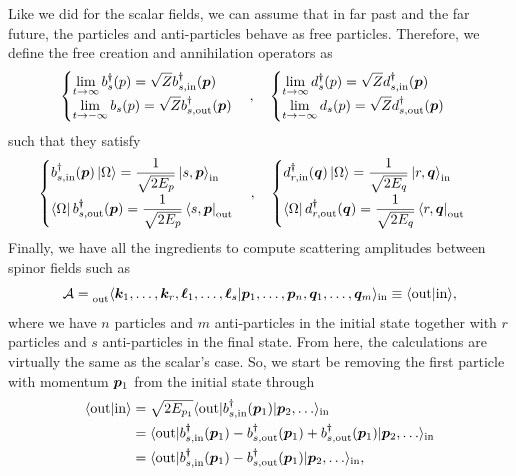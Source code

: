 Like we did for the scalar fields, we can assume that in far past and the far future, the particles and anti-particles behave as free particles. Therefore, we define the free creation and annihilation operators as 
\begin{equation}
    \begin{cases}
        \displaystyle\lim_{t \to \infty}b_s^\dagger(p) = \sqrt{Z}b_{s,\mathrm{in}}^\dagger(\bm{p}) \\
        \displaystyle\lim_{t \to -\infty}b_s(p) = \sqrt{Z}b_{s,\mathrm{out}}^\dagger(\bm{p})
    \end{cases},\quad 
    \begin{cases}
        \displaystyle\lim_{t \to \infty}d_s^\dagger(p) = \sqrt{Z}d_{s,\mathrm{in}}^\dagger(\bm{p}) \\
        \displaystyle\lim_{t \to -\infty}d_s(p) = \sqrt{Z}d_{s,\mathrm{out}}^\dagger(\bm{p})
    \end{cases}
\end{equation}
such that they satisfy
\begin{equation}
        \begin{cases}
            b^\dagger_{s,\mathrm{in}}(\bm{p})\ket{\Omega} = \dfrac{1}{\sqrt{2E_p}}\ket{s,\bm{p}}_{\mathrm{in}} \\[2ex]
            \bra{\Omega} b^\dagger_{s,\mathrm{out}}(\bm{p}) = \dfrac{1}{\sqrt{2E_p}}\bra{s,\bm{p}}_{\mathrm{out}}
        \end{cases},\quad 
        \begin{cases}
            d^\dagger_{r,\mathrm{in}}(\bm{q})\ket{\Omega} = \dfrac{1}{\sqrt{2E_q}}\ket{r,\bm{q}}_{\mathrm{in}} \\[2ex]
            \bra{\Omega} d^\dagger_{r,\mathrm{out}}(\bm{q}) = \dfrac{1}{\sqrt{2E_q}}\bra{r,\bm{q}}_{\mathrm{out}}
        \end{cases}
\end{equation}
Finally, we have all the ingredients to compute scattering amplitudes between spinor fields such as 
\begin{equation}
    \mathcal{A} = \prescript{}{\mathrm{out}}{\langle \bm{k}_1,\dots,\bm{k}_r,\bm{\ell}_1,\dots,\bm{\ell}_s | \bm{p}_1,\dots,\bm{p}_n,\bm{q}_1,\dots,\bm{q}_m \rangle}_{\mathrm{in}} \equiv \langle \mathrm{out} | \mathrm{in} \rangle,
\end{equation}
where we have $n$ particles and $m$ anti-particles in the initial state together with $r$ particles and $s$ anti-particles in the final state. From here, the calculations are virtually the same as the scalar's case. So, we start be removing the first particle with momentum $\bm{p}_1$ from the initial state through
\begin{equation}
    \begin{split}
        \mybraket{\rem{out}}{\rem{in}} &= \sqrt{2E_{p_1}}\mybrakett{\rem{out}}{b^\dg_{s,\rem{in}}(\v{p}_1)}{\v{p}_2,\dots}_{\rem{in}} \\
        &= \mybrakett{\rem{out}}{b^\dg_{s,\rem{in}}(\v{p}_1) - b^\dg_{s,\rem{out}}(\v{p}_1) + b^\dg_{s,\rem{out}}(\v{p}_1)}{\v{p}_2,\dots}_{\rem{in}} \\
        &= \mybrakett{\rem{out}}{b^\dg_{s,\rem{in}}(\v{p}_1) - b^\dg_{s,\rem{out}}(\v{p}_1)}{\v{p}_2,\dots}_{\rem{in}},
    \end{split}
\end{equation}
